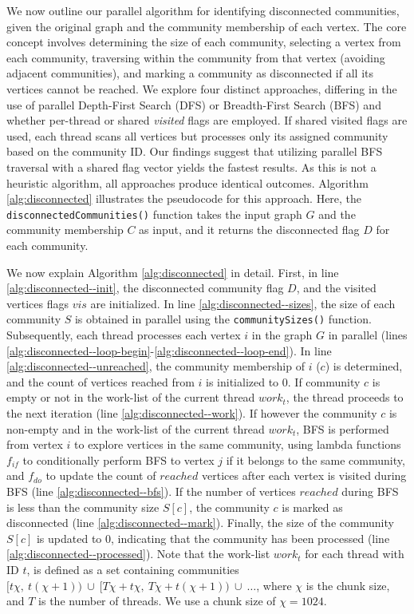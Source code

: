 We now outline our parallel algorithm for identifying disconnected communities, given the original graph and the community membership of each vertex. The core concept involves determining the size of each community, selecting a vertex from each community, traversing within the community from that vertex (avoiding adjacent communities), and marking a community as disconnected if all its vertices cannot be reached. We explore four distinct approaches, differing in the use of parallel Depth-First Search (DFS) or Breadth-First Search (BFS) and whether per-thread or shared \textit{visited} flags are employed. If shared visited flags are used, each thread scans all vertices but processes only its assigned community based on the community ID. Our findings suggest that utilizing parallel BFS traversal with a shared flag vector yields the fastest results. As this is not a heuristic algorithm, all approaches produce identical outcomes. Algorithm \ref{alg:disconnected} illustrates the pseudocode for this approach. Here, the \texttt{disconnectedCommunities()} function takes the input graph $G$ and the community membership $C$ as input, and it returns the disconnected flag $D$ for each community.

We now explain Algorithm \ref{alg:disconnected} in detail. First, in line \ref{alg:disconnected--init}, the disconnected community flag $D$, and the visited vertices flags $vis$ are initialized. In line \ref{alg:disconnected--sizes}, the size of each community $S$ is obtained in parallel using the \texttt{communitySizes()} function. Subsequently, each thread processes each vertex $i$ in the graph $G$ in parallel (lines \ref{alg:disconnected--loop-begin}-\ref{alg:disconnected--loop-end}). In line \ref{alg:disconnected--unreached}, the community membership of $i$ ($c$) is determined, and the count of vertices reached from $i$ is initialized to $0$. If community $c$ is empty or not in the work-list of the current thread $work_t$, the thread proceeds to the next iteration (line \ref{alg:disconnected--work}). If however the community $c$ is non-empty and in the work-list of the current thread $work_t$, BFS is performed from vertex $i$ to explore vertices in the same community, using lambda functions $f_{if}$ to conditionally perform BFS to vertex $j$ if it belongs to the same community, and $f_{do}$ to update the count of $reached$ vertices after each vertex is visited during BFS (line \ref{alg:disconnected--bfs}). If the number of vertices $reached$ during BFS is less than the community size $S[c]$, the community $c$ is marked as disconnected (line \ref{alg:disconnected--mark}). Finally, the size of the community $S[c]$ is updated to $0$, indicating that the community has been processed (line \ref{alg:disconnected--processed}). Note that the work-list $work_t$ for each thread with ID $t$, is defined as a set containing communities $[t\chi,\ t(\chi+1))\ \cup\ [T\chi + t\chi,\ T\chi + t(\chi+1))\ \cup\ \ldots$, where $\chi$ is the chunk size, and $T$ is the number of threads. We use a chunk size of $\chi = 1024$.
